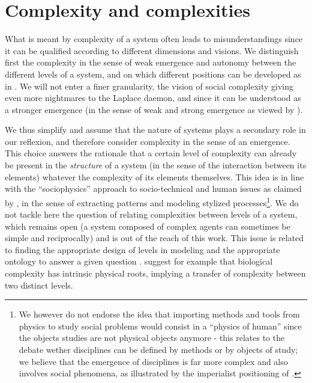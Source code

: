 \section{Complexity and complexities}


What is meant by complexity of a system often leads to misunderstandings since it can be qualified according to different dimensions and visions. We distinguish first the complexity in the sense of weak emergence and autonomy between the different levels of a system, and on which different positions can be developed as in \cite{deffuant2015visions}. We will not enter a finer granularity, the vision of social complexity giving even more nightmares to the Laplace daemon, and since it can be understood as a stronger emergence (in the sense of weak and strong emergence as viewed by \cite{bedau2002downward}).


We thus simplify and assume that the nature of systems plays a secondary role in our reflexion, and therefore consider complexity in the sense of an emergence. This choice answers the rationale that a certain level of complexity can already be present in the \emph{structure} of a system (in the sense of the interaction between its elements) whatever the complexity of its elements themselves. This idea is in line with the ``sociophysics'' approach to socio-technical and human issues as claimed by \cite{caldarelli2018physics}, in the sense of extracting patterns and modeling stylized processes\footnote{We however do not endorse the idea that importing methods and tools from physics to study social problems would consist in a ``physics of human'' since the objects studies are not physical objects anymore - this relates to the debate wether disciplines can be defined by methods or by objects of study; we believe that the emergence of disciplines is far more complex and also involves social phenomena, as illustrated by the imperialist positioning of \cite{caldarelli2018physics}.}. We do not tackle here the question of relating complexities between levels of a system, which remains open (a system composed of complex agents can sometimes be simple and reciprocally) and is out of the reach of this work. This issue is related to finding the appropriate design of levels in modeling and the appropriate ontology to answer a given question \cite{roth2009reconstruction}. \cite{WolfE8678} suggest for example that biological complexity has intrinsic physical roots, implying a transfer of complexity between two distinct levels.


